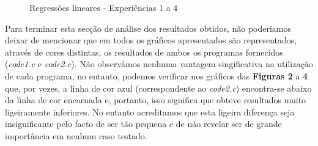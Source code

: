 \documentclass{article}
\begin{document}
\begin{figure} [!htbp]
    \centering
    \qquad
    \caption{Regressões lineares - Experiências 1 a 4}%
    \label{fig:example}%
\end{figure}

\par
Para terminar esta secção de análise dos resultados obtidos, não poderiamos deixar de mencionar que em todos os gráficos apresentados são representados, através de cores distintas, os resultados de ambos os programas fornecidos (\textit{code1.c} e \textit{code2.c}). Não observámos nenhuma vantagem singificativa na utilização de cada programa, no entanto, podemos verificar nos gráficos das \textbf{Figuras 2} a \textbf{4} que, por vezes, a linha de cor azul (correspondente ao \textit{code2.c}) encontra-se abaixo da linha de cor encarnada e, portanto, isso significa que obteve resultados muito ligeiramente inferiores. No entanto acreditamos que esta ligeira diferença seja insignificante pelo facto de ser tão pequena e de não revelar ser de grande importância em nenhum caso testado.
\end{document}
